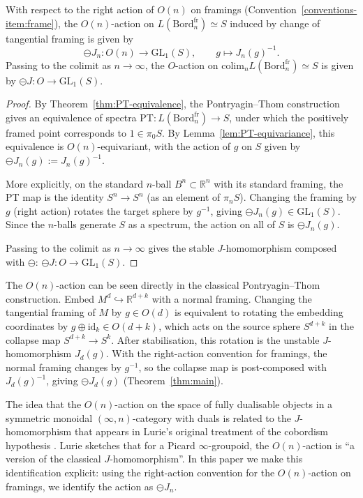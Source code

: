 \documentclass{amsart}
\begin{document}
\begin{theorem}
\label{thm:main}
With respect to the right action of $O(n)$ on framings (Convention~\ref{conventions-item:frame}), the $O(n)$-action on $L(\mathrm{Bord}_n^{\mathrm{fr}}) \simeq S$ induced by change of tangential framing is given by
\[
\ominus J_n \colon O(n) \longrightarrow \mathrm{GL}_1(S), \qquad g \mapsto J_n(g)^{-1}.
\]
Passing to the colimit as $n \to \infty$, the $O$-action on $\mathrm{colim}_n L(\mathrm{Bord}_n^{\mathrm{fr}}) \simeq S$ is given by $\ominus J \colon O \to \mathrm{GL}_1(S)$.
\end{theorem}

\begin{proof}
By Theorem~\ref{thm:PT-equivalence}, the Pontryagin--Thom construction gives an equivalence of spectra $\mathrm{PT} \colon L(\mathrm{Bord}_n^{\mathrm{fr}}) \to S$, under which the positively framed point corresponds to $1 \in \pi_0 S$. By Lemma~\ref{lem:PT-equivariance}, this equivalence is $O(n)$-equivariant, with the action of $g$ on $S$ given by $\ominus J_n(g) := J_n(g)^{-1}$.

More explicitly, on the standard $n$-ball $B^n \subset \mathbb{R}^n$ with its standard framing, the PT map is the identity $S^n \to S^n$ (as an element of $\pi_n S$). Changing the framing by $g$ (right action) rotates the target sphere by $g^{-1}$, giving $\ominus J_n(g) \in \mathrm{GL}_1(S)$. Since the $n$-balls generate $S$ as a spectrum, the action on all of $S$ is $\ominus J_n(g)$.

Passing to the colimit as $n \to \infty$ gives the stable $J$-homomorphism composed with $\ominus$: $\ominus J \colon O \to \mathrm{GL}_1(S)$.
\end{proof}
\begin{remark}
\label{rmk:rotation-picture}
The $O(n)$-action can be seen directly in the classical Pontryagin--Thom construction. Embed $M^d \hookrightarrow \mathbb{R}^{d+k}$ with a normal framing. Changing the tangential framing of $M$ by $g \in O(d)$ is equivalent to rotating the embedding coordinates by $g \oplus \mathrm{id}_k \in O(d+k)$, which acts on the source sphere $S^{d+k}$ in the collapse map $S^{d+k} \to S^k$. After stabilisation, this rotation is the unstable $J$-homomorphism $J_d(g)$. With the right-action convention for framings, the normal framing changes by $g^{-1}$, so the collapse map is post-composed with $J_d(g)^{-1}$, giving $\ominus J_d(g)$ (Theorem~\ref{thm:main}).
\end{remark}
\begin{remark}
\label{rmk:Lurie-observation}
The idea that the $O(n)$-action on the space of fully dualisable objects in a symmetric monoidal $(\infty,n)$-category with duals is related to the $J$-homomorphism that appears in Lurie's original treatment of the cobordism hypothesis \cite[Example 2.4.15]{MR2555928}. Lurie sketches that for a Picard $\infty$-groupoid, the $O(n)$-action is ``a version of the classical $J$-homomorphism''. In this paper we make this identification explicit: using the right-action convention for the $O(n)$-action on framings, we identify the action as $\ominus J_n$.
\end{remark}
\end{document}
